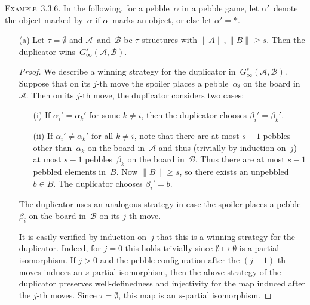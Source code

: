 \documentclass[letterpaper]{article}
\newcommand{\A}{\mathcal{A}}
\newcommand{\B}{\mathcal{B}}
\newcommand{\card}[1]{\|{#1}\|}
\newcommand{\example}[1]{\noindent\textsc{Example~{#1}.}}
\theoremstyle{plain}
\begin{document}
\bigskip
\example{3.3.6}
In the following, for a pebble~$\alpha$ in a pebble game, let $\alpha'$~denote the object marked by~$\alpha$ if $\alpha$~marks an object, or else let $\alpha'=*$.
\begin{enumerate}
\item[(a)] Let $\tau=\emptyset$ and $\A$~and~$\B$ be $\tau$-structures with $\card{A},\card{B}\ge s$. Then the duplicator wins~$G_{\infty}^s(\A,\B)$.
\begin{proof}
We describe a winning strategy for the duplicator in~$G_{\infty}^s(\A,\B)$. Suppose that on its $j$-th move the spoiler places a pebble~$\alpha_i$ on the board in~$\A$. Then on its $j$-th move, the duplicator considers two cases:
\begin{enumerate}
\item[(i)] If $\alpha_i'=\alpha_k'$ for some $k\ne i$, then the duplicator chooses $\beta_i'=\beta_k'$.
\item[(ii)] If $\alpha_i'\ne\alpha_k'$ for all $k\ne i$, note that there are at most $s-1$ pebbles other than~$\alpha_k$ on the board in~$\A$ and thus (trivially by induction on~$j$) at most $s-1$ pebbles~$\beta_k$ on the board in~$\B$. Thus there are at most $s-1$ pebbled elements in~$B$. Now $\card{B}\ge s$, so there exists an unpebbled $b\in B$. The duplicator chooses $\beta_i'=b$.
\end{enumerate}
The duplicator uses an analogous strategy in case the spoiler places a pebble~$\beta_i$ on the board in~$\B$ on its $j$-th move.

It is easily verified by induction on~$j$ that this is a winning strategy for the duplicator. Indeed, for $j=0$ this holds trivially since $\emptyset\mapsto\emptyset$ is a partial isomorphism. If $j>0$ and the pebble configuration after the $(j-1)$-th moves induces an $s$-partial isomorphism, then the above strategy of the duplicator preserves well-definedness and injectivity for the map induced after the $j$-th moves. Since $\tau=\emptyset$, this map is an $s$-partial isomorphism.


\end{proof}
\end{enumerate}
\end{document}
